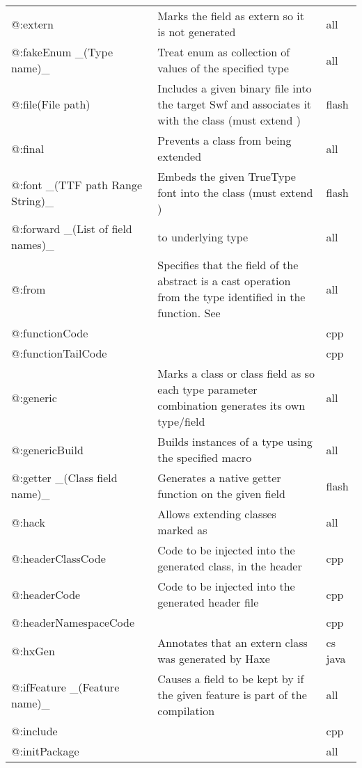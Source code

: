 \begin{center}
\begin{tabular}{| l | l | l |}
	@:extern  &  Marks the field as extern so it is not generated  &  all \\
	@:fakeEnum \_(Type name)\_  &  Treat enum as collection of values of the specified type  &  all \\
	@:file(File path)  &  Includes a given binary file into the target Swf and associates it with the class (must extend \expr{flash.utils.ByteArray})  &  flash \\
	@:final  &  Prevents a class from being extended  &  all \\
	@:font \_(TTF path Range String)\_  &  Embeds the given TrueType font into the class (must extend \expr{flash.text.Font})  &  flash \\
	@:forward \_(List of field names)\_  &  \tref{Forwards field access}{types-abstract-forward} to underlying type  &  all \\
	@:from   &  Specifies that the field of the abstract is a cast operation from the type identified in the function. See \tref{Implicit Casts}{types-abstract-implicit-casts}  &  all \\
	@:functionCode  &     &  cpp \\
	@:functionTailCode  &    &  cpp \\
	@:generic &  Marks a class or class field as \tref{generic}{type-system-generic} so each type parameter combination generates its own type/field  &  all \\
	@:genericBuild  &  Builds instances of a type using the specified macro   &  all \\
	@:getter \_(Class field name)\_  &  Generates a native getter function on the given field   &  flash \\
	@:hack   &  Allows extending classes marked as \expr{@:final}  &  all \\
	@:headerClassCode  &  Code to be injected into the generated class, in the header  &  cpp \\
	@:headerCode   &  Code to be injected into the generated header file  &  cpp \\
	@:headerNamespaceCode  &    &  cpp \\
	@:hxGen  &  Annotates that an extern class was generated by Haxe  &  cs  java \\
	@:ifFeature \_(Feature name)\_  &  Causes a field to be kept by \tref{DCE}{cr-dce} if the given feature is part of the compilation  &  all \\
	@:include &     &  cpp \\
	@:initPackage  &    &  all \\

\end{tabular}
\end{center}
